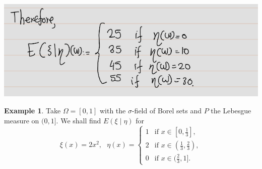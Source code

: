 \documentclass[
]{book}
\theoremstyle{definition}
\theoremstyle{definition}
\newtheorem{example}{Example}[chapter]
\theoremstyle{definition}
\theoremstyle{definition}
\theoremstyle{remark}
\begin{document}
\includegraphics[width=18cm,height=\textheight]{fig/fig eg2.2-3.png}

\begin{example}
\protect\hypertarget{exm:unnamed-chunk-47}{}\label{exm:unnamed-chunk-47}Take \(\Omega = [0, 1]\) with the \(\sigma\)-field of Borel sets and \(P\) the Lebesgue measure on \((0, 1]\). We shall find \(E(\xi \mid \eta)\) for
\[
\xi(x)=2x^2,~~~
\eta(x) = 
\begin{cases} 
1 & \text{if } x \in [0, \frac{1}{3}], \\
2 & \text{if } x \in (\frac{1}{3}, \frac{2}{3}), \\
0 & \text{if } x \in (\frac{2}{3}, 1].
\end{cases}
\]
\end{example}
\end{document}
